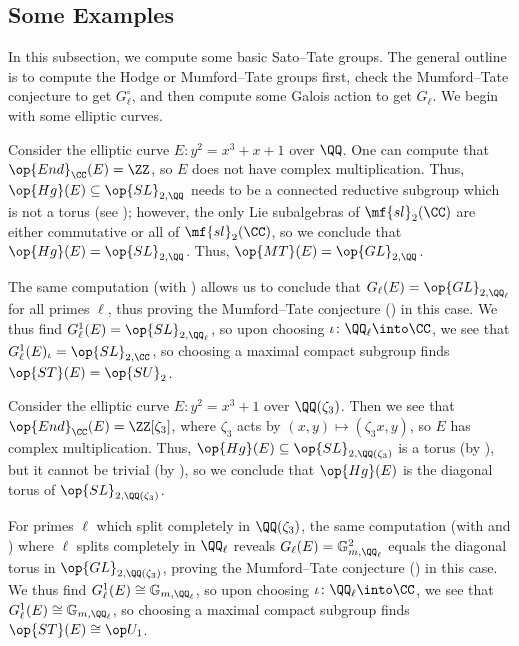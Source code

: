 \documentclass[../thesis.tex]{subfiles}
\begin{document}
\subsection{Some Examples}
In this subsection, we compute some basic Sato--Tate groups. The general outline is to compute the Hodge or Mumford--Tate groups first, check the Mumford--Tate conjecture to get $G_\ell^\circ$, and then compute some Galois action to get $G_\ell$. We begin with some elliptic curves.
\begin{example} \label{ex:ec-no-cm-st}
	Consider the elliptic curve $E\colon y^2=x^3+x+1$ over $\QQ$. One can compute that $\op{End}_\CC(E)=\ZZ$, so $E$ does not have complex multiplication. Thus, $\op{Hg}(E)\subseteq\op{SL}_{2,\QQ}$ needs to be a connected reductive subgroup which is not a torus (see ); however, the only Lie subalgebras of $\mf{sl}_2(\CC)$ are either commutative or all of $\mf{sl}_2(\CC)$, so we conclude that $\op{Hg}(E)=\op{SL}_{2,\QQ}$. Thus, $\op{MT}(E)=\op{GL}_{2,\QQ}$.
	
	The same computation (with ) allows us to conclude that $G_\ell(E)=\op{GL}_{2,\QQ_\ell}$ for all primes $\ell$, thus proving the Mumford--Tate conjecture () in this case. We thus find $G_\ell^1(E)=\op{SL}_{2,\QQ_\ell}$, so upon choosing $\iota\colon\QQ_\ell\into\CC$, we see that $G_\ell^1(E)_\iota=\op{SL}_{2,\CC}$, so choosing a maximal compact subgroup finds $\op{ST}(E)=\op{SU}_2$.
\end{example}
\begin{example} \label{ex:cm-ec-st}
	Consider the elliptic curve $E\colon y^2=x^3+1$ over $\QQ(\zeta_3)$. Then we see that $\op{End}_\CC(E)=\ZZ[\zeta_3]$, where $\zeta_3$ acts by $(x,y)\mapsto(\zeta_3x,y)$, so $E$ has complex multiplication. Thus, $\op{Hg}(E)\subseteq\op{SL}_{2,\QQ(\zeta_3)}$ is a torus (by ), but it cannot be trivial (by ), so we conclude that $\op{Hg}(E)$ is the diagonal torus of $\op{SL}_{2,\QQ(\zeta_3)}$.

	For primes $\ell$ which split completely in $\QQ(\zeta_3)$, the same computation (with  and ) where $\ell$ splits completely in $\QQ_\ell$ reveals $G_\ell(E)=\mathbb G_{m,\QQ_\ell}^2$ equals the diagonal torus in $\op{GL}_{2,\QQ(\zeta_3)}$, proving the Mumford--Tate conjecture () in this case. We thus find $G_\ell^1(E)\cong\mathbb G_{m,\QQ_\ell}$, so upon choosing $\iota\colon\QQ_\ell\into\CC$, we see that $G_\ell^1(E)\cong\mathbb G_{m,\QQ_\ell}$, so choosing a maximal compact subgroup finds $\op{ST}(E)\cong\op U_1$.
\end{example}
\end{document}
